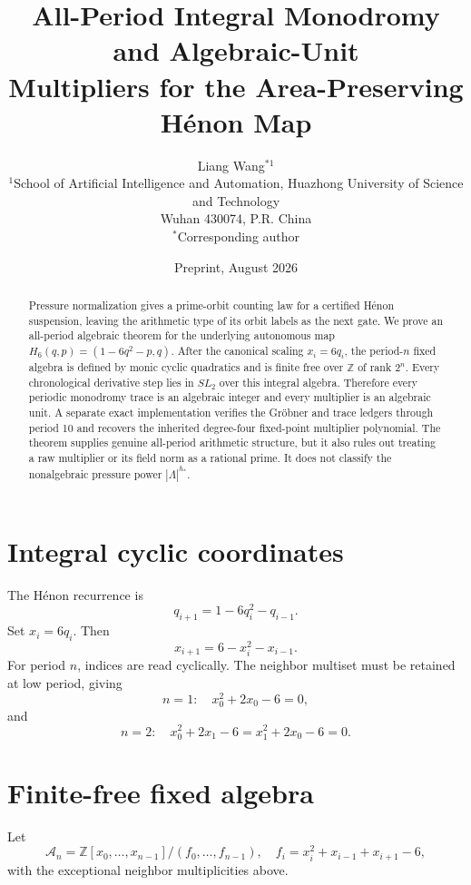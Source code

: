 \documentclass[11pt]{article}
\title{All-Period Integral Monodromy and Algebraic-Unit\\Multipliers for the Area-Preserving H\'enon Map}
\author{Liang Wang$^{*1}$\\
\small $^{1}$School of Artificial Intelligence and Automation, Huazhong University of Science and Technology\\
\small Wuhan 430074, P.R. China\\
\small $^*$Corresponding author}
\date{Preprint, August 2026}
\theoremstyle{remark}\newtheorem{remark}[theorem]{Remark}
\begin{document}
\maketitle
\begin{abstract}
Pressure normalization gives a prime-orbit counting law for a certified
H\'enon suspension, leaving the arithmetic type of its orbit labels as the
next gate.  We prove an all-period algebraic theorem for the underlying
autonomous map $H_6(q,p)=(1-6q^2-p,q)$.  After the canonical scaling
$x_i=6q_i$, the period-$n$ fixed algebra is defined by monic cyclic
quadratics and is finite free over $\mathbb Z$ of rank $2^n$.  Every
chronological derivative step lies in $SL_2$ over this integral algebra.
Therefore every periodic monodromy trace is an algebraic integer and every
multiplier is an algebraic unit.  A separate exact implementation verifies
the Gr\"obner and trace ledgers through period 10 and recovers the inherited
degree-four fixed-point multiplier polynomial.  The theorem supplies genuine
all-period arithmetic structure, but it also rules out treating a raw
multiplier or its field norm as a rational prime.  It does not classify the
nonalgebraic pressure power $|\Lambda|^{h_*}$.
\end{abstract}

\section{Integral cyclic coordinates}
The H\'enon recurrence is
\[
q_{i+1}=1-6q_i^2-q_{i-1}.
\]
Set $x_i=6q_i$.  Then
\begin{equation}\label{eq:scaled}
x_{i+1}=6-x_i^2-x_{i-1}.
\end{equation}
For period $n$, indices are read cyclically.  The neighbor multiset must be
retained at low period, giving
\[
n=1:\quad x_0^2+2x_0-6=0,
\]
and
\[
n=2:\quad x_0^2+2x_1-6=x_1^2+2x_0-6=0.
\]

\section{Finite-free fixed algebra}
Let
\[
\mathcal A_n=\mathbb Z[x_0,\ldots,x_{n-1}]/(f_0,\ldots,f_{n-1}),
\quad
f_i=x_i^2+x_{i-1}+x_{i+1}-6,
\]
with the exceptional neighbor multiplicities above.
\end{document}
